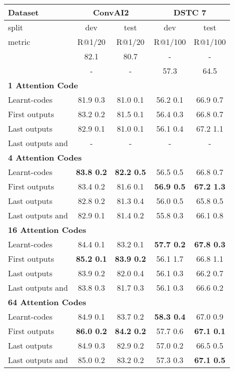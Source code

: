 \documentclass{article} \usepackage{iclr2020_conference,times}
\begin{document}
\begin{table*}[h]
\center
\begin{tabular}{|l|c|c|c|c|}
\hline
 Dataset & \multicolumn{2}{c|}{ConvAI2} & \multicolumn{2}{c|}{DSTC 7}\\ \hline
 split & dev & test & dev & test \\
 \hline
metric & R@1/20 & R@1/20 & R@1/100 & R@1/100 \\
\hline
\hline
\citep{wolf2019transfertransfo} & 82.1 & 80.7 & - & -   \\
\hline
\citep{chen_noetic} & - & - & 57.3 & 64.5 \\
\hline
\hline
 \multicolumn{5}{|l|}{\textbf{1 Attention Code}}  \\
\hline
Learnt-codes	& 81.9  0.3 &	81.0  0.1 & 56.2  0.1 &	66.9  0.7\\
First  outputs	& 83.2  0.2 &	81.5  0.1 & 56.4  0.3 &	66.8  0.7 \\

Last  outputs	& 82.9  0.1 &  81.0  0.1 & 56.1  0.4 &	67.2  1.1\\
Last  outputs and  & - & - & - & -\\		

\hline
 \multicolumn{5}{|l|}{\textbf{4 Attention Codes}}  \\
\hline
Learnt-codes	& \textbf{83.8  0.2} &	\textbf{82.2  0.5} & 56.5  0.5	& 66.8  0.7 \\
First  outputs	& 83.4  0.2 &	81.6  0.1 & \textbf{56.9  0.5}	& \textbf{67.2  1.3} \\
Last  outputs	& 82.8  0.2 &	81.3  0.4 & 56.0  0.5	& 65.8  0.5\\
Last  outputs and  &	82.9  0.1	 & 81.4  0.2 & 55.8  0.3	& 66.1  0.8\\

\hline
 \multicolumn{5}{|l|}{\textbf{16 Attention Codes}}  \\
\hline		
Learnt-codes &	84.4  0.1 &	83.2  0.1  & \textbf{57.7  0.2} & \textbf{	67.8  0.3}\\
First  outputs &	\textbf{85.2  0.1}	& \textbf{83.9  0.2}  & 56.1  1.7 & 	66.8  1.1\\
Last  outputs &	83.9  0.2	 & 82.0  0.4  & 56.1  0.3 & 	66.2  0.7\\
Last  outputs and  &	83.8  0.3 &	81.7  0.3  & 56.1  0.3 & 	66.6  0.2\\

\hline
 \multicolumn{5}{|l|}{\textbf{64 Attention Codes}}  \\
\hline		
Learnt-codes &	84.9  0.1 &	83.7  0.2  & \textbf{58.3  0.4} & 	67.0  0.9\\
First  outputs &	\textbf{86.0  0.2} &	\textbf{84.2  0.2} & 57.7  0.6 & 	\textbf{67.1  0.1} \\
Last  outputs &	84.9  0.3 &	82.9  0.2  & 57.0  0.2 & 	66.5  0.5\\
Last  outputs and  &	85.0  0.2 &	83.2  0.2  & 57.3  0.3 & 	\textbf{67.1  0.5}\\


\end{tabular}
\end{table*}
\end{document}
